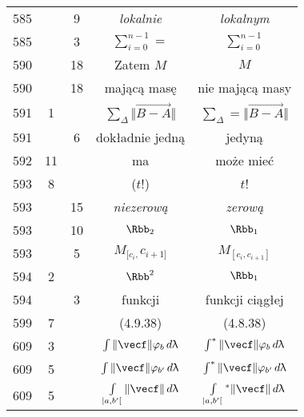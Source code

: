 \documentclass[a4paper,11pt]{article}
\numberwithin{equation}{section}
\renewcommand{\lambda}{\uplambda}
\begin{document}
\begin{center}
\begin{tabular}{|c|c|c|c|c|}
    585 & &  9 & \textit{lokalnie} & \textit{lokalnym} \\
    585 & &  3 & $\sum\limits_{ i = 0 }^{ n - 1 } =$
           & $\sum\limits_{ i = 0 }^{ n - 1 }$ \\
    590 & & 18 & Zatem $M$ & $M$ \\
    590 & & 18 & mającą masę & nie mającą masy \\
    591 &  1 & & $\sum\limits_{ \Delta } \Vert \overrightarrow{ B - A } \Vert$
           & $\sum\limits_{ \Delta } = \Vert \overrightarrow{ B - A } \Vert$ \\
    591 & &  6 & dokładnie jedną & jedyną \\
    592 & 11 & & ma & może mieć \\
    593 &  8 & & ($ t $!) & $ t $! \\
    593 & & 15 & \textit{niezerową} & \textit{zerową} \\
    593 & & 10 & $\Rbb_{ 2 }$ & $\Rbb_{ 1 }$ \\
    593 & &  5 & $M_{ [ c_{ i }, } c_{ i + 1 ] }$
           & $M_{ [ c_{ i }, c_{ i + 1 } ] }$ \\
    594 &  2 & & $\Rbb^{ 2 }$ & $\Rbb_{ 1 }$ \\
    594 & &  3 & funkcji & funkcji ciągłej \\
    599 &  7 & & (4.9.38) & (4.8.38) \\
    609 &  3 & & $\int \Vert \vecf \Vert \varphi_{ b } \, d\lambda$
           & $\int^{ * } \Vert \vecf \Vert \varphi_{ b } \, d\lambda$ \\
    609 &  5 & & $\int \Vert \vecf \Vert \varphi_{ b' } \, d\lambda$
           & $\int^{ * } \Vert \vecf \Vert \varphi_{ b' } \, d\lambda$ \\
    609 &  5 & & $\int\limits_{ | a, b' [ } \Vert \vecf \Vert \, d\lambda$
           & $\int\limits_{ | a, b' [ }{^{ * }} \Vert \vecf \Vert \, d\lambda$ \\
    \hline
  \end{tabular}






\end{center}
\end{document}
